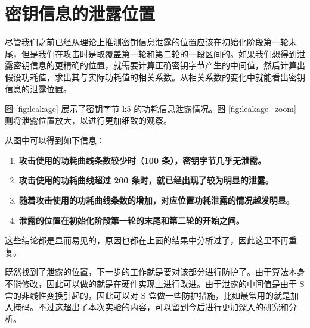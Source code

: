 \newpage

\section{密钥信息的泄露位置}

尽管我们之前已经从理论上推测密钥信息泄露的位置应该在初始化阶段第一轮末尾，但是我们在攻击时是取覆盖第一轮和第二轮的一段区间的。如果我们想得到泄露密钥信息的更精确的位置，就需要计算正确密钥字节产生的中间值，然后计算出假设功耗值，求出其与实际功耗值的相关系数。从相关系数的变化中就能看出密钥信息的泄露位置。

\vspace*{\baselineskip}

图 \ref{fig:leakage} 展示了密钥字节 k5 的功耗信息泄露情况。图 \ref{fig:leakage_zoom} 则将泄露位置放大，以进行更加细致的观察。

从图中可以得到如下信息：

\begin{enumerate}
    \item \textbf{攻击使用的功耗曲线条数较少时（100 条），密钥字节几乎无泄露。}
    \item \textbf{攻击使用的功耗曲线超过 200 条时，就已经出现了较为明显的泄露。}
    \item \textbf{随着攻击使用的功耗曲线条数的增加，对应位置功耗泄露的情况越发明显。}
    \item \textbf{泄露的位置在初始化阶段第一轮的末尾和第二轮的开始之间。}
\end{enumerate}

\vspace*{\baselineskip}

这些结论都是显而易见的，原因也都在上面的结果中分析过了，因此这里不再重复。

\vspace*{\baselineskip}

既然找到了泄露的位置，下一步的工作就是要对该部分进行防护了。由于算法本身不能修改，因此可以做的就是在硬件实现上进行改进。由于泄露的中间值是由于 S 盒的非线性变换引起的，因此可以对 S 盒做一些防护措施，比如最常用的就是加入掩码。不过这超出了本次实验的内容，可以留到今后进行更加深入的研究和分析。


